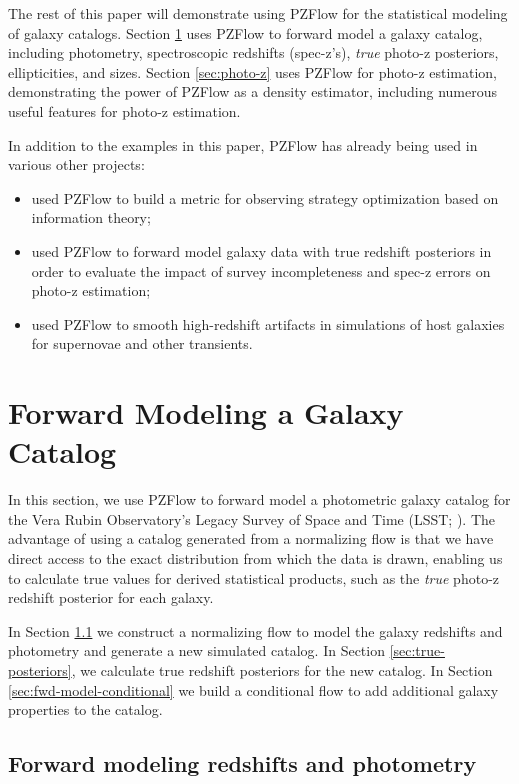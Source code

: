 \documentclass[twocolumn,twocolappendix]{aastex631}
\begin{document}
The rest of this paper will demonstrate using PZFlow for the statistical modeling of galaxy catalogs.
Section \ref{sec:galaxy-catalog} uses PZFlow to forward model a galaxy catalog, including photometry, spectroscopic redshifts (spec-z's), \emph{true} photo-z posteriors, ellipticities, and sizes.
Section \ref{sec:photo-z} uses PZFlow for photo-z estimation, demonstrating the power of PZFlow as a density estimator, including numerous useful features for photo-z estimation.

In addition to the examples in this paper, PZFlow has already being used in various other projects:
\begin{itemize}
    \item \citet{malz2021} used PZFlow to build a metric for observing strategy optimization based on information theory;
    \item \citet{stylianou2022} used PZFlow to forward model galaxy data with true redshift posteriors in order to evaluate the impact of survey incompleteness and spec-z errors on photo-z estimation;
    \item \citet{lokken2022} used PZFlow to smooth high-redshift artifacts in simulations of host galaxies for supernovae and other transients.
\end{itemize}


\section{Forward Modeling a Galaxy Catalog}
\label{sec:galaxy-catalog}

In this section, we use PZFlow to forward model a photometric galaxy catalog for the Vera Rubin Observatory's Legacy Survey of Space and Time (LSST; \citealt{ivezic2019}).
The advantage of using a catalog generated from a normalizing flow is that we have direct access to the exact distribution from which the data is drawn, enabling us to calculate true values for derived statistical products, such as the \emph{true} photo-z redshift posterior for each galaxy.

In Section \ref{sec:fwd-model} we construct a normalizing flow to model the galaxy redshifts and photometry and generate a new simulated catalog.
In Section \ref{sec:true-posteriors}, we calculate true redshift posteriors for the new catalog.
In Section \ref{sec:fwd-model-conditional} we build a conditional flow to add additional galaxy properties to the catalog.

\subsection{Forward modeling redshifts and photometry}
\label{sec:fwd-model}
\end{document}

